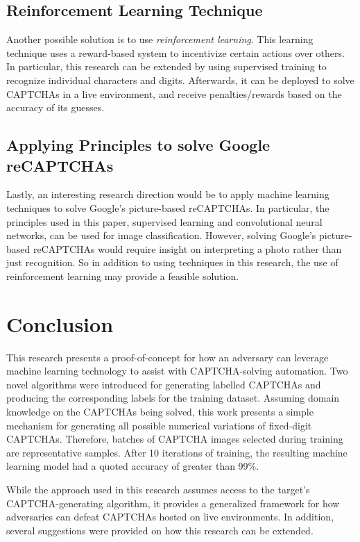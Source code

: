 \documentclass[11pt,conference]{IEEEtran}
\begin{document}
\subsection{Reinforcement Learning Technique}
Another possible solution is to use \emph{reinforcement learning}. This learning technique uses a reward-based
system to incentivize certain actions over others. In particular, this research
can be extended by using supervised training to recognize individual
characters and digits. Afterwards, it can be deployed to solve CAPTCHAs in a
live environment, and receive penalties/rewards based on the accuracy of its
guesses.

\subsection{Applying Principles to solve Google reCAPTCHAs}
Lastly, an interesting research direction would be to apply machine learning
techniques to solve Google's picture-based reCAPTCHAs. In particular, the
principles used in this paper, supervised learning and convolutional neural
networks, can be used for image classification. However, solving Google's picture-based
reCAPTCHAs would require insight on interpreting a photo
rather than just recognition. So in addition to using techniques in this
research, the use of reinforcement learning may provide a feasible solution.


\section{Conclusion}
This research presents a proof-of-concept for how an adversary
can leverage machine learning technology to assist with CAPTCHA-solving
automation. Two novel algorithms were
introduced for generating labelled CAPTCHAs and producing the corresponding
labels for the training dataset. Assuming domain knowledge on the CAPTCHAs
being solved, this work presents a simple mechanism for generating all possible
numerical variations of fixed-digit CAPTCHAs. Therefore, batches of
CAPTCHA images selected during training are representative samples. After 10
iterations of training, the resulting machine learning model had a quoted
accuracy of greater than 99\%. 

While the approach used in this research assumes access to the target's
CAPTCHA-generating algorithm, it provides a generalized framework for how
adversaries can defeat CAPTCHAs hosted on live environments. In addition,
several suggestions were provided on how this research
can be extended.
\end{document}

